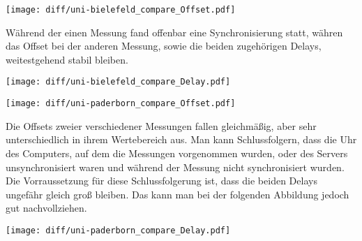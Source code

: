 \documentclass[a4paper, 11pt, fleqn, notitlepage, egregdoesnotlikesansseriftitles]{scrartcl}
\begin{document}
\begin{center}
    \texttt{[image: diff/uni-bielefeld\_compare\_Offset.pdf]}
    \label{fig:diff:bielefeld:offset}
\end{center}

Während der einen Messung fand offenbar eine Synchronisierung statt, währen das Offset bei der anderen Messung, sowie die beiden zugehörigen Delays, weitestgehend stabil bleiben.

\begin{center}
    \texttt{[image: diff/uni-bielefeld\_compare\_Delay.pdf]}
    \label{fig:diff:bielefeld:delay}
\end{center}

\begin{center}
    \texttt{[image: diff/uni-paderborn\_compare\_Offset.pdf]}
    \label{fig:diff:paderborn:offst}
\end{center}

Die Offsets zweier verschiedener Messungen fallen gleichmäßig, aber sehr unterschiedlich in ihrem Wertebereich aus. Man kann Schlussfolgern, dass die Uhr des Computers, auf dem die Messungen vorgenommen wurden, oder des Servers unsynchronisiert waren und während der Messung nicht synchronisiert wurden. Die Vorraussetzung für diese Schlussfolgerung ist, dass die beiden Delays ungefähr gleich groß bleiben. Das kann man bei der folgenden Abbildung jedoch gut nachvollziehen.

\begin{center}
    \texttt{[image: diff/uni-paderborn\_compare\_Delay.pdf]}
    \label{fig:diff:paderborn:delay}
\end{center}

\end{document}
